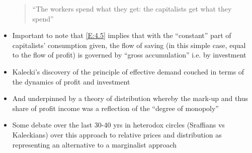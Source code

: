 \documentclass[a4paper,twoside]{article}
\numberwithin{equation}{section}
\numberwithin{figure}{section}
\begin{document}
\begin{itemize}
		\begin{quote}
			``The workers spend what they get: the capitalists get what they spend''
		\end{quote}
		\item Important to note that \cref{E:4.5} implies that with the ``constant'' part of capitalists' consumption given, the flow of saving (in this simple case, equal to the flow of profit) is governed by ``gross accumulation'' i.e. by investment\
		\item Kalecki's discovery of the principle of effective demand couched in terms of the dynamics of profit and investment
		\item And underpinned by a theory of distribution whereby the mark-up and thus share of profit income was a reflection of the ``degree of monopoly''
		\item Some debate over the last 30-40 yrs in heterodox circles (Sraffians vs Kaleckians) over this approach to relative prices and distribution as representing an alternative to a marginalist approach
	\end{itemize}
\end{document}
